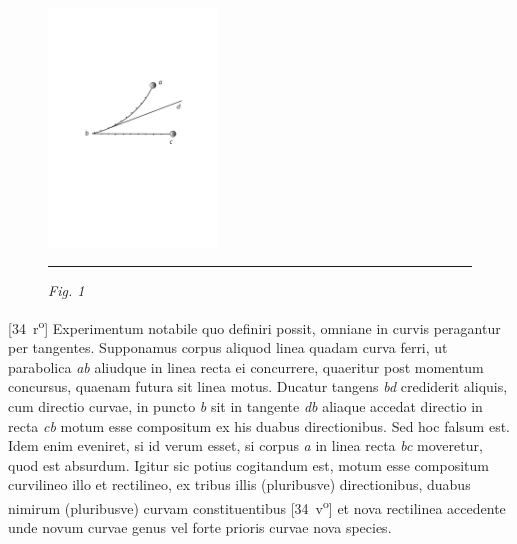  \vspace*{8mm}
 \pstart 
 \normalsize
\begin{figure}
 \includegraphics[width=0.4\textwidth]{images/lh374_34rkonvertiert.pdf}\\
\rule[0cm]{23mm}{0cm}\textit{Fig. 1}
\end{figure}
[34~r\textsuperscript{o}] Experimentum notabile quo definiri possit, omniane in curvis peragantur per tangentes. Supponamus corpus aliquod linea quadam curva ferri, ut parabolica \textit{ab} aliudque in linea recta ei concurrere, quaeritur post momentum concursus\protect{}, quaenam futura sit linea motus. Ducatur tangens \textit{bd} crediderit aliquis, cum directio curvae, in puncto \textit{b} sit in tangente \textit{db} aliaque accedat directio in recta \textit{cb} motum esse compositum ex his duabus directionibus. Sed hoc falsum est. Idem enim eveniret, si id verum esset,  si corpus \textit{a} in linea recta \textit{bc} moveretur, quod est absurdum. Igitur sic potius cogitandum est, motum esse compositum  curvilineo illo et rectilineo,  ex tribus illis (pluribusve) directionibus, duabus nimirum (pluribusve) curvam constituentibus [34~v\textsuperscript{o}] et nova rectilinea accedente unde novum curvae genus vel forte prioris curvae nova species.\pend
 

